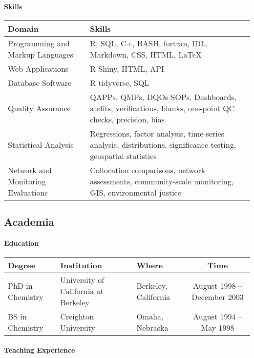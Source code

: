 \documentclass[
]{article}
\begin{document}
\hypertarget{skills}{%
\paragraph{Skills}\label{skills}}

\begin{longtable}{ll}
\toprule
Domain & Skills \\ 
\midrule
Programming and Markup Languages & R, SQL, C+, BASH, fortran, IDL, Markdown, CSS, HTML, LaTeX \\ 
Web Applications & R Shiny, HTML, API \\ 
Database Software & R tidyverse, SQL \\ 
Quality Assurance & QAPPs, QMPs, DQOs SOPs, Dashboards, audits, verifications, blanks, one-point QC checks, precision, bias \\ 
Statistical Analysis & Regressions, factor analysis, time-series analysis, distributions, significance testing, geospatial statistics \\ 
Network and Monitoring Evaluations & Collocation comparisons, network assessments, community-scale monitoring, GIS, environmental justice \\ 
\bottomrule
\end{longtable}

\hypertarget{academia}{%
\subsection{Academia}\label{academia}}

\hypertarget{education}{%
\paragraph{Education}\label{education}}

\begin{longtable}{lllc}
\toprule
Degree & Institution & Where & Time \\ 
\midrule
PhD in Chemistry & University of California at Berkeley & Berkeley, California & August 1998 -- December 2003 \\ 
BS in Chemistry & Creighton University & Omaha, Nebraska & August 1994 -- May 1998 \\ 
\bottomrule
\end{longtable}

\hypertarget{teaching-experience}{%
\paragraph{Teaching Experience}\label{teaching-experience}}
\end{document}
